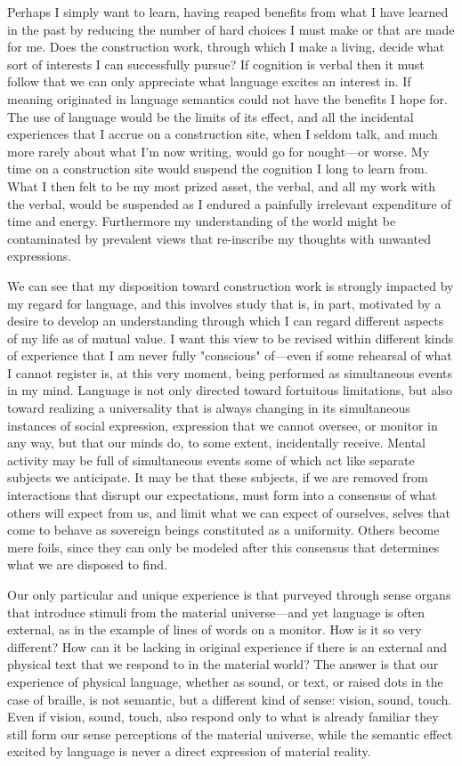 \documentclass[
]{memoir}
\begin{document}
Perhaps I simply want to learn, having reaped benefits from what I have
learned in the past by reducing the number of hard choices I must make
or that are made for me. Does the construction work, through which I
make a living, decide what sort of interests I can successfully pursue?
If cognition is verbal then it must follow that we can only appreciate
what language excites an interest in. If meaning originated in language
semantics could not have the benefits I hope for. The use of language
would be the limits of its effect, and all the incidental experiences
that I accrue on a construction site, when I seldom talk, and much more
rarely about what I'm now writing, would go for nought---or worse. My
time on a construction site would suspend the cognition I long to learn
from. What I then felt to be my most prized asset, the verbal, and all
my work with the verbal, would be suspended as I endured a painfully
irrelevant expenditure of time and energy. Furthermore my understanding
of the world might be contaminated by prevalent views that re-inscribe
my thoughts with unwanted expressions.

We can see that my disposition toward construction work is strongly
impacted by my regard for language, and this involves study that is, in
part, motivated by a desire to develop an understanding through which I
can regard different aspects of my life as of mutual value. I want this
view to be revised within different kinds of experience that I am never
fully "conscious" of---even if some rehearsal of what I cannot register
is, at this very moment, being performed as simultaneous events in my
mind. Language is not only directed toward fortuitous limitations, but
also toward realizing a universality that is always changing in its
simultaneous instances of social expression, expression that we cannot
oversee, or monitor in any way, but that our minds do, to some extent,
incidentally receive. Mental activity may be full of simultaneous events
some of which act like separate subjects we anticipate. It may be that
these subjects, if we are removed from interactions that disrupt our
expectations, must form into a consensus of what others will expect from
us, and limit what we can expect of ourselves, selves that come to
behave as sovereign beings constituted as a uniformity. Others become
mere foils, since they can only be modeled after this consensus that
determines what we are disposed to find.

Our only particular and unique experience is that purveyed through sense
organs that introduce stimuli from the material universe---and yet
language is often external, as in the example of lines of words on a
monitor. How is it so very different? How can it be lacking in original
experience if there is an external and physical text that we respond to
in the material world? The answer is that our experience of physical
language, whether as sound, or text, or raised dots in the case of
braille, is not semantic, but a different kind of sense: vision, sound,
touch. Even if vision, sound, touch, also respond only to what is
already familiar they still form our sense perceptions of the material
universe, while the semantic effect excited by language is never a
direct expression of material reality.
\end{document}
